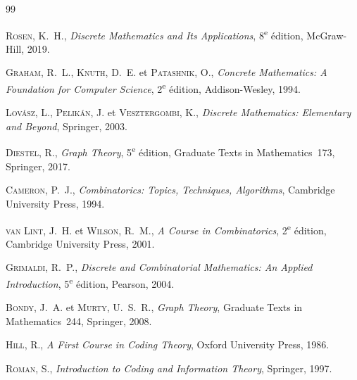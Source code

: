 \documentclass[12pt,a4paper,openany]{book}
\theoremstyle{definition}
\theoremstyle{plain}
\theoremstyle{remark}
\begin{document}
\begin{thebibliography}{99}

\textsc{Rosen}, K.~H.,
\textit{Discrete Mathematics and Its Applications},
8\textsuperscript{e} édition, McGraw-Hill, 2019.

\textsc{Graham}, R.~L., \textsc{Knuth}, D.~E. et \textsc{Patashnik}, O.,
\textit{Concrete Mathematics: A Foundation for Computer Science},
2\textsuperscript{e} édition, Addison-Wesley, 1994.

\textsc{Lov\'asz}, L., \textsc{Pelik\'an}, J. et \textsc{Vesztergombi}, K.,
\textit{Discrete Mathematics: Elementary and Beyond},
Springer, 2003.

\textsc{Diestel}, R.,
\textit{Graph Theory},
5\textsuperscript{e} édition, Graduate Texts in Mathematics~173,
Springer, 2017.

\textsc{Cameron}, P.~J.,
\textit{Combinatorics: Topics, Techniques, Algorithms},
Cambridge University Press, 1994.

\textsc{van Lint}, J.~H. et \textsc{Wilson}, R.~M.,
\textit{A Course in Combinatorics},
2\textsuperscript{e} édition, Cambridge University Press, 2001.

\textsc{Grimaldi}, R.~P.,
\textit{Discrete and Combinatorial Mathematics: An Applied Introduction},
5\textsuperscript{e} édition, Pearson, 2004.

\textsc{Bondy}, J.~A. et \textsc{Murty}, U.~S.~R.,
\textit{Graph Theory},
Graduate Texts in Mathematics~244, Springer, 2008.

\textsc{Hill}, R.,
\textit{A First Course in Coding Theory},
Oxford University Press, 1986.

\textsc{Roman}, S.,
\textit{Introduction to Coding and Information Theory},
Springer, 1997.

\end{thebibliography}


\printindex
\end{document}
